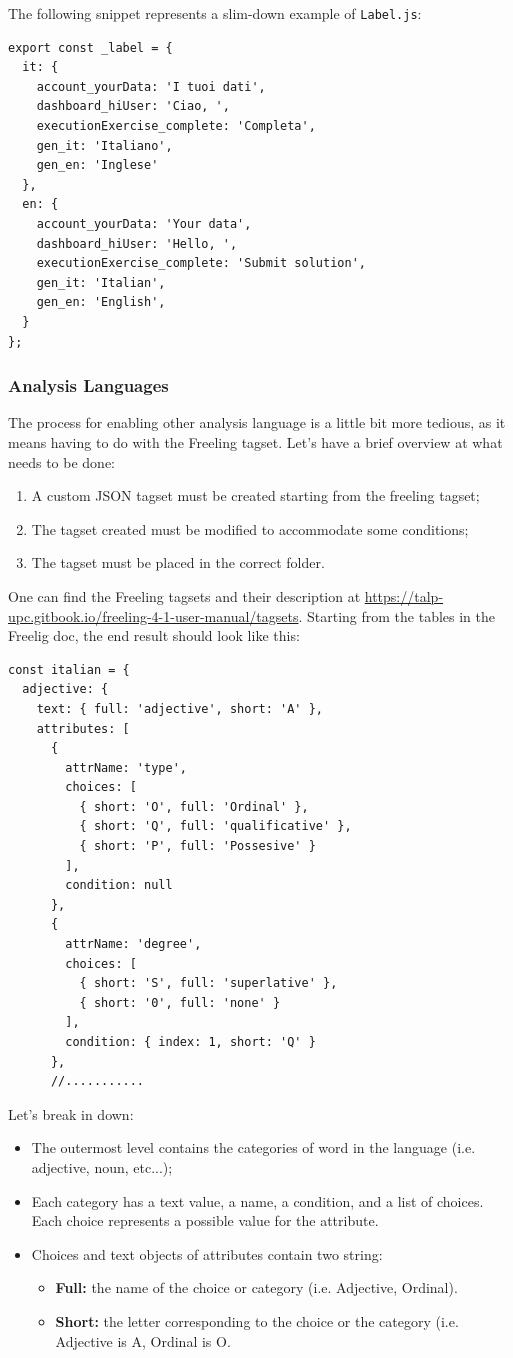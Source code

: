 The following snippet represents a slim-down example of \texttt{Label.js}:
\begin{lstlisting}
export const _label = {
  it: {
    account_yourData: 'I tuoi dati',
    dashboard_hiUser: 'Ciao, ',
    executionExercise_complete: 'Completa',
    gen_it: 'Italiano',
    gen_en: 'Inglese'
  },
  en: {
    account_yourData: 'Your data',
    dashboard_hiUser: 'Hello, ',
    executionExercise_complete: 'Submit solution',
    gen_it: 'Italian',
    gen_en: 'English',
  }
};
\end{lstlisting}


\subsubsection{Analysis Languages}
The process for enabling other analysis language is a little bit more tedious, as it means having to do with the Freeling tagset.
Let's have a brief overview at what needs to be done:
\begin{enumerate}
\item A custom JSON tagset must be created starting from the freeling tagset;
\item The tagset created must be modified to accommodate some conditions;
\item The tagset must be placed in the correct folder.
\end{enumerate}
One can find the Freeling tagsets and their description at \url{https://talp-upc.gitbook.io/freeling-4-1-user-manual/tagsets}. Starting from the tables in the Freelig doc, the end result should look like this:
\begin{lstlisting}
const italian = {
  adjective: {
    text: { full: 'adjective', short: 'A' },
    attributes: [
      {
        attrName: 'type',
        choices: [
          { short: 'O', full: 'Ordinal' },
          { short: 'Q', full: 'qualificative' },
          { short: 'P', full: 'Possesive' }
        ],
        condition: null
      },
      {
        attrName: 'degree',
        choices: [
          { short: 'S', full: 'superlative' },
          { short: '0', full: 'none' }
        ],
        condition: { index: 1, short: 'Q' }
      },
      //...........
\end{lstlisting}
Let's break in down:
\begin{itemize}
\item The outermost level contains the categories of word in the language (i.e. adjective, noun, etc...);
\item Each category has a text value, a name, a condition, and a list of choices. Each choice represents a possible value for the attribute.
\item Choices and text objects of attributes contain two string:
	\begin{itemize}
	\item \textbf{Full:} the name of the choice or category (i.e. Adjective, Ordinal).
	\item \textbf{Short:} the letter corresponding to the choice or the category (i.e. Adjective is A, Ordinal is O.
	\end{itemize}
\end{itemize}
